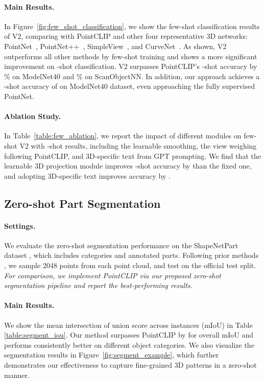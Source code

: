 \documentclass[10pt,twocolumn,letterpaper]{article}
\begin{document}
\vspace{-0.1cm}
\paragraph{Main Results.} 
In Figure~\ref{fig:few_shot_classification}, we show the few-shot classification results of V2, comparing with PointCLIP and other four representative 3D networks: PointNet~\cite {qi2016pointnet}, PointNet++~\cite{qi2017pointnet++}, SimpleView~\cite{goyal2021revisiting}, and CurveNet~\cite{Xiang2021Walk}. As shown, V2 outperforms all other methods by few-shot training and shows a more significant improvement on -shot classification. V2 surpasses PointCLIP's -shot accuracy by \% on ModelNet40 and \% on ScanObjectNN. In addition, our approach achieves a -shot accuracy of  on ModelNet40 dataset, even approaching the fully supervised PointNet\cite{qi2016pointnet}.

\vspace{-0.1cm}
\paragraph{Ablation Study. }
In Table~\ref{table:few_ablation}, we report the impact of different modules on few-shot V2 with -shot results, including the learnable smoothing, the view weighing following PointCLIP, and 3D-specific text from GPT prompting.
We find that the learnable 3D projection module improves -shot accuracy by  than the fixed one, and adopting 3D-specific text improves accuracy by . 

\subsection{Zero-shot Part Segmentation}

\paragraph{Settings.} 
We evaluate the zero-shot segmentation performance on the ShapeNetPart dataset \cite{yi2016scalable}, which includes  categories and  annotated parts. Following prior methods \cite{qi2017pointnet++,wang2019dynamic,ma2022rethinking}, we sample 2048 points from each point cloud, and test on the official test split. \textit{For comparison, we implement PointCLIP via our proposed zero-shot segmentation pipeline and report the best-performing results.} 

\vspace{-0.1cm}
\paragraph{Main Results.}
We show the mean intersection of union score across instances (mIoU) in Table \ref{table:segment_iou}. Our method surpasses PointCLIP by  for overall mIoU and performs consistently better on different object categories. We also visualize the segmentation results in Figure~\ref{fig:segment_example}, which further demonstrates our effectiveness to capture fine-grained 3D patterns in a zero-shot manner.
\end{document}

